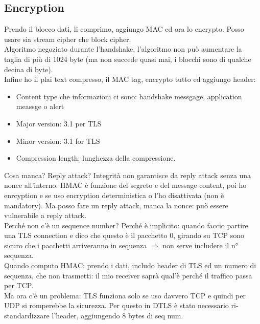 \documentclass[16px]{article}
\begin{document}
\subsection{Encryption}
Prendo il blocco dati, li comprimo, aggiungo MAC ed ora lo encrypto. Posso usare sia stream cipher che block cipher.\\ Algoritmo negoziato durante l'handshake, l'algoritmo non può aumentare la taglia di più di 1024 byte (ma non succede quasi mai, i blocchi sono di qualche decina di byte).\\ Infine ho il plai text compresso, il MAC tag, encrypto tutto ed aggiungo header: 
\begin{itemize}
\item Content type che informazioni ci sono: handshake messgage, application meassge o alert
\item Major version: 3.1 per TLS
\item Minor version: 3.1 for TLS
\item Compression length: lunghezza della compressione.
\end{itemize}
Cosa manca? Reply attack? Integrità non garantisce da reply attack senza una nonce all'interno. HMAC è funzione del segreto e del message content, poi ho enrcyption e se uso encryption deterministica o l'ho disattivata (non è mandatory). Ma posso fare un reply attack, manca la nonce: può essere vulnerabile a reply attack.\\ Perché non c'è un sequence number? Perché è implicito: quando faccio partire una TLS connection e dico che questo è il pacchetto 0, girando su TCP sono sicuro che i pacchetti arriveranno in sequenza $\Rightarrow$ non serve includere il n° sequenza.\\ Quando computo HMAC: prendo i dati, includo header di TLS ed un numero di sequenza, che non trasmetti: il mio receiver saprà qual'è perché il traffico passa per TCP.\\ Ma ora c'è un problema: TLS funziona solo se uso davvero TCP e quindi per UDP si romperebbe la sicurezza. Per questo in DTLS è stato necessario ri-standardizzare l'header, aggiungendo 8 bytes di seq num.
\end{document}

